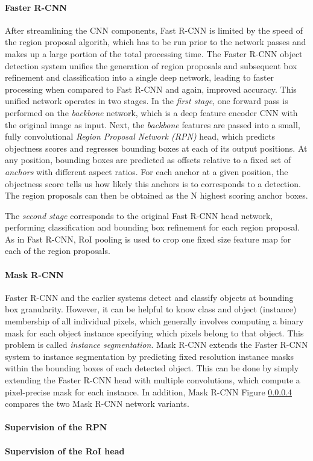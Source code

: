 \paragraph{Faster R-CNN}
After streamlining the CNN components, Fast R-CNN is limited by the speed of the region proposal
algorith, which has to be run prior to the network passes and makes up a large portion of the total
processing time.
The Faster R-CNN object detection system \cite{FasterRCNN} unifies the generation of region proposals and subsequent box refinement and
classification into a single deep network, leading to faster processing when compared to Fast R-CNN
and again, improved accuracy.
This unified network operates in two stages.
In the \emph{first stage}, one forward pass is performed on the \emph{backbone} network,
which is a deep feature encoder CNN with the original image as input.
Next, the \emph{backbone} features are passed into a small, fully convolutional \emph{Region Proposal Network (RPN)} head, which
predicts objectness scores and regresses bounding boxes at each of its output positions.
At any position, bounding boxes are predicted as offsets relative to a fixed set of \emph{anchors} with different
aspect ratios.
For each anchor at a given position, the objectness score tells us how likely this anchors is to corresponds to a detection.
The region proposals can then be obtained as the N highest scoring anchor boxes.

The \emph{second stage} corresponds to the original Fast R-CNN head network, performing classification
and bounding box refinement for each region proposal.
As in Fast R-CNN, RoI pooling is used to crop one fixed size feature map for each of the region proposals.


\paragraph{Mask R-CNN}
Faster R-CNN and the earlier systems detect and classify objects at bounding box granularity.
However, it can be helpful to know class and object (instance) membership of all individual pixels,
which generally involves computing a binary mask for each object instance specifying which pixels belong
to that object. This problem is called \emph{instance segmentation}.
Mask R-CNN \cite{MaskRCNN} extends the Faster R-CNN system to instance segmentation by predicting
fixed resolution instance masks within the bounding boxes of each detected object.
This can be done by simply extending the Faster R-CNN head with multiple convolutions, which
compute a pixel-precise mask for each instance.
In addition, Mask R-CNN
Figure \ref{} compares the two Mask R-CNN network variants.

\paragraph{Supervision of the RPN}
\paragraph{Supervision of the RoI head}
